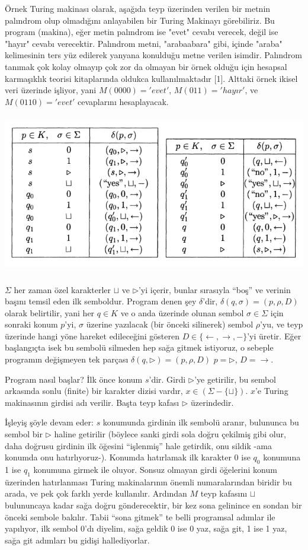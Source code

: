 \documentclass[12pt,fleqn]{article}\usepackage{../../common}
\begin{document}
Örnek Turing makinası olarak, aşağıda teyp üzerinden verilen bir metnin
palındrom olup olmadığını anlayabilen bir Turing Makinayı görebiliriz. Bu
program (makina), eğer metin palındrom ise "evet" cevabı verecek, değil ise
"hayır" cevabı verecektir. Palındrom metni, "arabaabara" gibi, içinde
"araba" kelimesinin ters yüz edilerek yanyana konulduğu metne verilen
isimdir. Palındrom tanımak çok kolay olmayıp çok zor da olmayan bir örnek
olduğu için hesapsal karmaşıklık teorisi kitaplarında oldukca
kullanılmaktadır [1]. Alttaki örnek ikisel veri üzerinde işliyor, yani
$M(0000) = 'evet'$, $M(011) = 'hayır'$, ve $M(0110) = 'evet'$ cevaplarını
hesaplayacak. 

\includegraphics[height=7cm]{turing_pallindrome.png}

$\Sigma$ her zaman özel karakterler $\sqcup$ ve $\rhd$'yi içerir, bunlar
sırasıyla ``boş'' ve verinin başını temsil eden ilk semboldur. Program
denen şey $\delta$'dir, $\delta(q,\sigma) = (p,\rho,D)$ olarak belirtilir,
yani her $q \in K$ ve o anda üzerinde olunan sembol $\sigma \in \Sigma$
için sonraki konum $p$'yi, $\sigma$ üzerine yazılacak (bir önceki
silinerek) sembol $\rho$'yu, ve teyp üzerinde hangi yöne hareket
edileceğini gösteren $D \in \{ \leftarrow, \rightarrow, -\}$'yi
üretir. Eğer başlangıçta isek bu sembolü silmeden hep sağa gitmek
istiyoruz, o sebeple programın değişmeyen tek parçası
$\delta(q,\rhd) = (p,\rho,D)$ $p=\rhd$, $D=\rightarrow$.

Program nasıl başlar? İlk önce konum $s$'dir. Girdi $\rhd$'ye getirilir, bu
sembol arkasında sonlu (finite) bir karakter dizisi vardır,
$x \in (\Sigma-\{\sqcup\} )$. $x$'e Turing makinasının girdisi adı
verilir. Başta teyp kafası $\rhd$ üzerindedir. 

İşleyiş şöyle devam eder: $s$ konumunda girdinin ilk sembolü aranır,
bulununca bu sembol bir $\rhd$ haline getirilir (böylece sanki girdi sola
doğru çekilmiş gibi olur, daha doğrusu girdinin ilk öğesini ``işlenmiş''
hale getirdik, onu sildik -ama konumda onu hatırlıyoruz-). Konumda
hatırlamak ilk karakter 0 ise $q_0$ konumuna 1 ise $q_1$ konumuna girmek
ile oluyor. Sonsuz olmayan girdi öğelerini konum üzerinden hatırlanması
Turing makinalarının önemli numaralarından biridir bu arada, ve pek çok
farklı yerde kullanılır. Ardından $M$ teyp kafasını $\sqcup$ bulununcaya
kadar sağa doğru gönderecektir, bir kez sona gelinince en sondan bir önceki
sembole bakılır. Tabii ``sona gitmek'' te belli programsal adımlar ile
yapılıyor, ilk sembol 0'dı diyelim, sağa geldik 0 ise 0 yaz, sağa git, 1
ise 1 yaz, sağa git adımları bu gidişi hallediyorlar. 
\end{document}
